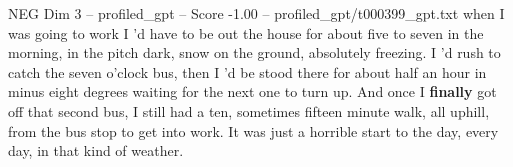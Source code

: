 \begin{textsample}{NEG Dim 3 – profiled\_gpt – Score -1.00 – profiled\_gpt/t000399\_gpt.txt}  \label{ex:f3_neg_026}
when I was going to work I ’d have to be out the house for about five to seven in the morning, in the pitch dark, snow on the ground, absolutely freezing.
I ’d rush to catch the seven o’clock bus, then I ’d be stood there for about half an hour in minus eight degrees waiting for the next one to turn up.
And once I \textbf{finally} got off that second bus, I still had a ten, sometimes fifteen minute walk, all uphill, from the bus stop to get into work.
It was just a horrible start to the day, every day, in that kind of weather.

\end{textsample}
